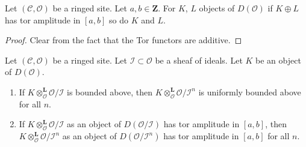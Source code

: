 \begin{lemma}
\label{lemma-summands-tor-amplitude}
Let $(\mathcal{C}, \mathcal{O})$ be a ringed site. Let $a, b \in \mathbf{Z}$.
For $K$, $L$ objects of $D(\mathcal{O})$ if $K \oplus L$ has tor
amplitude in $[a, b]$ so do $K$ and $L$.
\end{lemma}

\begin{proof}
Clear from the fact that the Tor functors are additive.
\end{proof}

\begin{lemma}
\label{lemma-bounded}
Let $(\mathcal{C}, \mathcal{O})$ be a ringed site.
Let $\mathcal{I} \subset \mathcal{O}$ be a sheaf of ideals.
Let $K$ be an object of $D(\mathcal{O})$.
\begin{enumerate}
\item If $K \otimes_\mathcal{O}^\mathbf{L} \mathcal{O}/\mathcal{I}$
is bounded above, then
$K \otimes_\mathcal{O}^\mathbf{L} \mathcal{O}/\mathcal{I}^n$
is uniformly bounded above for all $n$.
\item If $K \otimes_\mathcal{O}^\mathbf{L} \mathcal{O}/\mathcal{I}$
as an object of $D(\mathcal{O}/\mathcal{I})$ has tor amplitude in $[a, b]$,
then $K \otimes_\mathcal{O}^\mathbf{L} \mathcal{O}/\mathcal{I}^n$
as an object of $D(\mathcal{O}/\mathcal{I}^n)$
has tor amplitude in $[a, b]$ for all $n$.
\end{enumerate}
\end{lemma}

